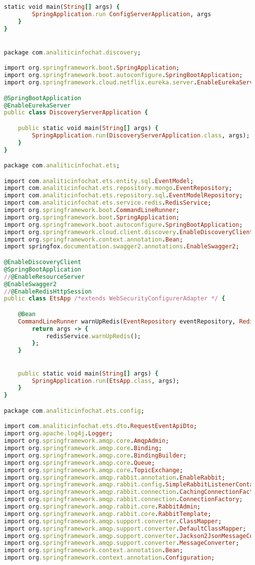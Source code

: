 \begin{lstlisting}[language=Ruby, style=rubystyle]
	static void main(String[] args) {
        SpringApplication.run ConfigServerApplication, args
	}
}


package com.analiticinfochat.discovery;

import org.springframework.boot.SpringApplication;
import org.springframework.boot.autoconfigure.SpringBootApplication;
import org.springframework.cloud.netflix.eureka.server.EnableEurekaServer;

@SpringBootApplication
@EnableEurekaServer
public class DiscoveryServerApplication {

	public static void main(String[] args) {
		SpringApplication.run(DiscoveryServerApplication.class, args);
	}
}

package com.analiticinfochat.ets;

import com.analiticinfochat.ets.entity.sql.EventModel;
import com.analiticinfochat.ets.repository.mongo.EventRepository;
import com.analiticinfochat.ets.repository.sql.EventModelRepository;
import com.analiticinfochat.ets.service.redis.RedisService;
import org.springframework.boot.CommandLineRunner;
import org.springframework.boot.SpringApplication;
import org.springframework.boot.autoconfigure.SpringBootApplication;
import org.springframework.cloud.client.discovery.EnableDiscoveryClient;
import org.springframework.context.annotation.Bean;
import springfox.documentation.swagger2.annotations.EnableSwagger2;

@EnableDiscoveryClient
@SpringBootApplication
//@EnableResourceServer
@EnableSwagger2
//@EnableRedisHttpSession
public class EtsApp /*extends WebSecurityConfigurerAdapter */ {

    @Bean
    CommandLineRunner warnUpRedis(EventRepository eventRepository, RedisService redisService) {
        return args -> {
            redisService.warnUpRedis();
        };
    }

  
    public static void main(String[] args) {
        SpringApplication.run(EtsApp.class, args);
    }
}

package com.analiticinfochat.ets.config;

import com.analiticinfochat.ets.dto.RequestEventApiDto;
import org.apache.log4j.Logger;
import org.springframework.amqp.core.AmqpAdmin;
import org.springframework.amqp.core.Binding;
import org.springframework.amqp.core.BindingBuilder;
import org.springframework.amqp.core.Queue;
import org.springframework.amqp.core.TopicExchange;
import org.springframework.amqp.rabbit.annotation.EnableRabbit;
import org.springframework.amqp.rabbit.config.SimpleRabbitListenerContainerFactory;
import org.springframework.amqp.rabbit.connection.CachingConnectionFactory;
import org.springframework.amqp.rabbit.connection.ConnectionFactory;
import org.springframework.amqp.rabbit.core.RabbitAdmin;
import org.springframework.amqp.rabbit.core.RabbitTemplate;
import org.springframework.amqp.support.converter.ClassMapper;
import org.springframework.amqp.support.converter.DefaultClassMapper;
import org.springframework.amqp.support.converter.Jackson2JsonMessageConverter;
import org.springframework.amqp.support.converter.MessageConverter;
import org.springframework.context.annotation.Bean;
import org.springframework.context.annotation.Configuration;


\end{lstlisting}
